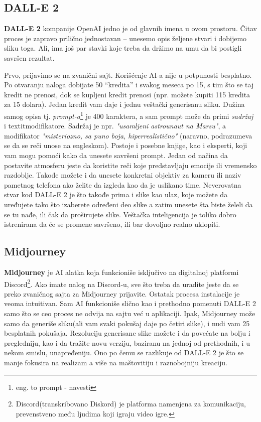 \documentclass[12pt, letterpaper]{article}
\begin{document}
\subsection{DALL-E 2}
\textbf{DALL-E 2} kompanije OpenAI jedno je od glavnih imena u ovom prostoru. Čitav proces je zapravo prilično jednostavan – unesemo opis željene stvari i dobijemo sliku toga. Ali, ima još par stavki koje treba da držimo na umu da bi postigli savršen rezultat. 

Prvo, prijavimo se na zvanični sajt. Korišćenje AI-a nije u potpunosti besplatno. Po otvaranju naloga dobijate 50 “kredita” i svakog meseca po 15, s tim što se taj kredit ne prenosi, dok se kupljeni kredit prenosi (npr. možete kupiti 115 kredita za 15 dolara). Jedan kredit vam daje i jednu veštački generisanu sliku. Dužina samog opisa tj. \textit{prompt-a}\footnote{eng. to prompt - navesti} je 400 karaktera, a sam prompt može da primi \textit{sadržaj} i textit{modifikatore}. Sadržaj je npr. \textit{"usamljeni astrounaut na Marsu"}, a modifikator \textit{"misteriozno, sa puno boja, hiperrealistično"} (naravno, podrazumeva se da se reči unose na engleskom). Postoje i posebne knjige\cite{Prompt}, kao i eksperti, koji vam mogu pomoći kako da unesete savršeni prompt. Jedan od načina da postavite atmosferu jeste da koristite reči koje predstavljaju emocije ili vremensko razdoblje. Takođe možete i da unesete konkretni objektiv za kameru ili naziv pametnog telefona ako želite da izgleda kao da je uslikano time. Neverovatna stvar kod DALL-E 2 je što takođe prima i slike kao ulaz, koje možete da uređujete tako što izaberete određeni deo slike a zatim unesete šta biste želeli da se tu nađe, ili čak da proširujete slike. Veštačka inteligencija je toliko dobro istrenirana da će se promene savršeno, ili bar dovoljno realno uklopiti. 
\subsection{Midjourney}
\textbf{Midjourney} je AI alatka koja funkcioniše isključivo na digitalnoj platformi Discord\footnote{Discord(transkribovano Diskord) je platforma namenjena za komunikaciju, prevenstveno među ljudima koji igraju video igre.}. Ako imate nalog na Discord-u, sve što treba da uradite jeste da se preko zvaničnog sajta za Midjourney prijavite. Ostatak procesa instalacije je veoma intuitivan. Sam  AI funkcioniše slično kao i prethodno pomenuti DALL-E 2 samo što se ceo proces ne odvija na sajtu već u aplikaciji. Ipak,  Midjourney može samo da generiše sliku(ali vam svaki pokušaj daje po četiri slike), i nudi vam 25 besplatnih pokušaja. Rezoluciju generisane slike možete i da povećate na bolju i pregledniju, kao i da tražite novu verziju, baziranu na jednoj od  prethodnih, i u nekom smislu, unapređeniju. Ono po čemu se razlikuje od DALL-E 2 je što se manje fokusira na realizam a više na maštovitiju i raznobojniju kreaciju.
\end{document}
